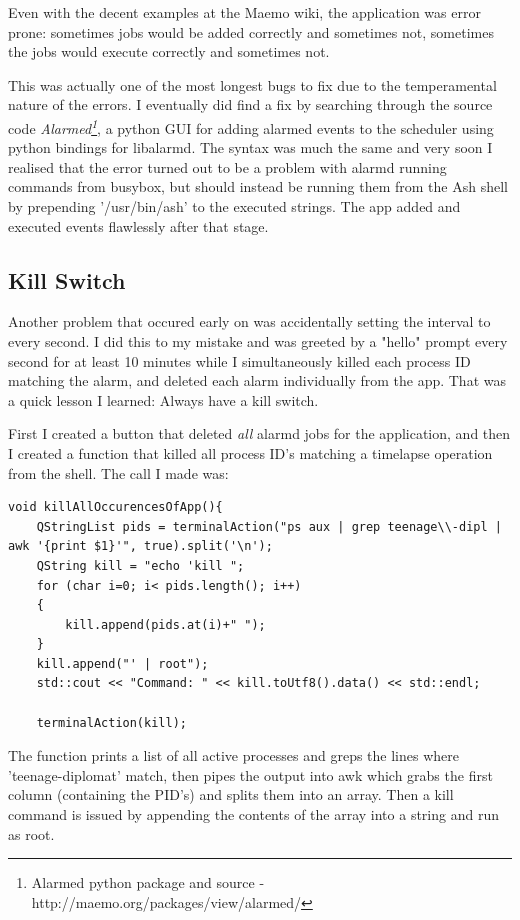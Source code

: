 Even with the decent examples at the Maemo wiki, the application was error prone: sometimes jobs would be added correctly and sometimes not, sometimes the jobs would execute correctly and sometimes not. 

This was actually one of the most longest bugs to fix due to the temperamental nature of the errors. I eventually did find a fix by searching through the source code {\it Alarmed\footnote{Alarmed python package and source - http://maemo.org/packages/view/alarmed/}\label{ref:alarmedpyth}}, a python GUI for adding alarmed events to the scheduler using python bindings for libalarmd. The syntax was much the same and very soon I realised that the error turned out to be a problem with alarmd running commands from busybox, but should instead be running them from the Ash shell by prepending '/usr/bin/ash' to the executed strings. The app added and executed events flawlessly after that stage.

\subsection{Kill Switch}


Another problem that occured early on was accidentally setting the interval to every second. I did this to my mistake and was greeted by a "hello" prompt every second for at least 10 minutes while I simultaneously killed each process ID matching the alarm, and deleted each alarm individually from the app. That was a quick lesson I learned: Always have a kill switch.

First I created a button that deleted {\it all} alarmd jobs for the application, and then I created a function that killed all process ID's matching a timelapse operation from the shell. The call I made was:\\
\vspace{-20pt}
\begin{lstlisting}[title=Kill Function]
void killAllOccurencesOfApp(){
    QStringList pids = terminalAction("ps aux | grep teenage\\-dipl | awk '{print $1}'", true).split('\n');
    QString kill = "echo 'kill ";
    for (char i=0; i< pids.length(); i++)
    {
        kill.append(pids.at(i)+" ");
    }
    kill.append("' | root");
    std::cout << "Command: " << kill.toUtf8().data() << std::endl;

    terminalAction(kill);
\end{lstlisting}
The function prints a list of all active processes and greps the lines where 'teenage-diplomat' match, then pipes the output into awk which grabs the first column (containing the PID's) and splits them into an array. Then a kill command is issued by appending the contents of the array into a string and run as root.

